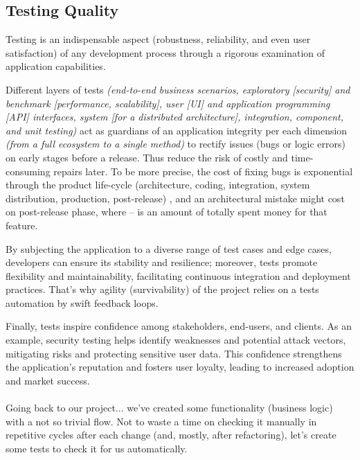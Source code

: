
\subsection{Testing Quality}

Testing is an indispensable aspect (robustness, reliability, and even user satisfaction) of any development process 
through a rigorous examination of application capabilities.

Different layers of tests \emph{(end-to-end business scenarios, exploratory [security] and benchmark [performance, scalability], 
user [UI] and application programming [API] interfaces, system [for a distributed architecture], integration, component,
and unit testing)} act as guardians of an application integrity per each dimension \emph{(from a full ecosystem to a 
single method)} to rectify issues (bugs or logic errors) on early stages before a release. Thus reduce the risk of 
costly and time-consuming repairs later. To be more precise, the cost of fixing bugs is exponential through the
product life-cycle (architecture, coding, integration, system distribution, production, post-release) 
\cite{Sanket19} \cite{Boeh88}, and an architectural mistake might cost  on post-release phase, where 
 -- is an amount of totally spent money for that feature.

By subjecting the application to a diverse range of test cases and edge cases, developers can ensure its stability and 
resilience; moreover, tests promote flexibility and maintainability, facilitating continuous integration and deployment 
practices. That's why agility (survivability) of the project relies on a tests automation by swift feedback loops.

Finally, tests inspire confidence among stakeholders, end-users, and clients. As an example, security testing helps 
identify weaknesses and potential attack vectors, mitigating risks and protecting sensitive user data. This confidence 
strengthens the application's reputation and fosters user loyalty, leading to increased adoption and market success.\\
\\

\noindent Going back to our project... we've created some functionality (business logic) with a not so trivial flow. 
Not to waste a time on checking it manually in repetitive cycles after each change (and, mostly, after 
refactoring), let's create some tests to check it for us automatically.


